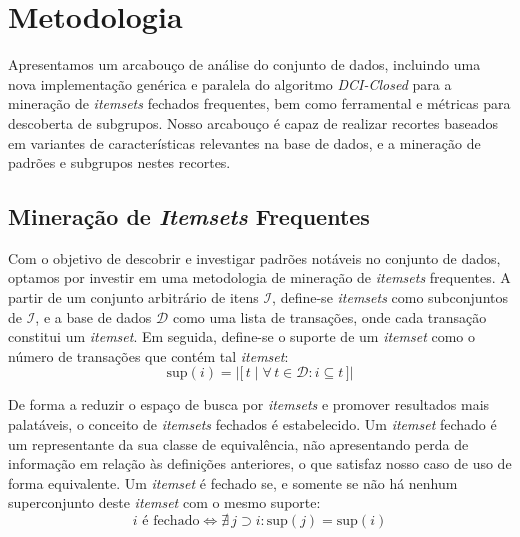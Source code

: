 \documentclass[12pt]{article}
\begin{document}

\pagebreak

\section{Metodologia}

Apresentamos um arcabouço de análise do conjunto de dados, \cite{framework} incluindo uma nova implementação genérica e paralela do algoritmo \textit{DCI-Closed} \cite{dci} para a mineração de \textit{itemsets} fechados frequentes, bem como ferramental e métricas para descoberta de subgrupos. Nosso arcabouço é capaz de realizar recortes baseados em variantes de características relevantes na base de dados, e a mineração de padrões e subgrupos nestes recortes.

\subsection{Mineração de \textit{Itemsets} Frequentes}

Com o objetivo de descobrir e investigar padrões notáveis no conjunto de dados, optamos por investir em uma metodologia de mineração de \textit{itemsets} frequentes. A partir de um conjunto arbitrário de itens $\mathcal{I}$, define-se \textit{itemsets} como subconjuntos de $\mathcal{I}$, e a base de dados $\mathcal{D}$ como uma lista de transações, onde cada transação constitui um \textit{itemset}. Em seguida, define-se o suporte de um \textit{itemset} como o número de transações que contém tal \textit{itemset}:
\[
 \text{sup}(i) = \big|\big[\, t \mid \forall\, t \in \mathcal{D}: i \subseteq t \,\big]\big|
\]

De forma a reduzir o espaço de busca por \textit{itemsets} e promover resultados mais palatáveis, o conceito de \textit{itemsets} fechados é estabelecido. Um \textit{itemset} fechado é um representante da sua classe de equivalência, não apresentando perda de informação em relação às definições anteriores, o que satisfaz nosso caso de uso de forma equivalente. Um \textit{itemset} é fechado se, e somente se não há nenhum superconjunto deste \textit{itemset} com o mesmo suporte:  \cite{dci}
\[
  i \text{ é fechado} \iff \nexists\, j \supset i: \text{sup}(j) = \text{sup}(i)
\]
\end{document}
